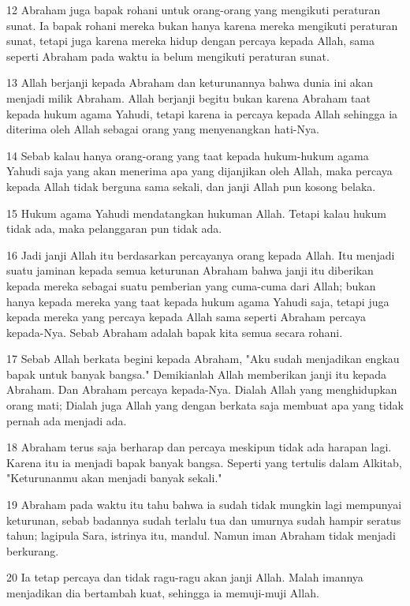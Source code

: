 \par 12 Abraham juga bapak rohani untuk orang-orang yang mengikuti peraturan sunat. Ia bapak rohani mereka bukan hanya karena mereka mengikuti peraturan sunat, tetapi juga karena mereka hidup dengan percaya kepada Allah, sama seperti Abraham pada waktu ia belum mengikuti peraturan sunat.
\par 13 Allah berjanji kepada Abraham dan keturunannya bahwa dunia ini akan menjadi milik Abraham. Allah berjanji begitu bukan karena Abraham taat kepada hukum agama Yahudi, tetapi karena ia percaya kepada Allah sehingga ia diterima oleh Allah sebagai orang yang menyenangkan hati-Nya.
\par 14 Sebab kalau hanya orang-orang yang taat kepada hukum-hukum agama Yahudi saja yang akan menerima apa yang dijanjikan oleh Allah, maka percaya kepada Allah tidak berguna sama sekali, dan janji Allah pun kosong belaka.
\par 15 Hukum agama Yahudi mendatangkan hukuman Allah. Tetapi kalau hukum tidak ada, maka pelanggaran pun tidak ada.
\par 16 Jadi janji Allah itu berdasarkan percayanya orang kepada Allah. Itu menjadi suatu jaminan kepada semua keturunan Abraham bahwa janji itu diberikan kepada mereka sebagai suatu pemberian yang cuma-cuma dari Allah; bukan hanya kepada mereka yang taat kepada hukum agama Yahudi saja, tetapi juga kepada mereka yang percaya kepada Allah sama seperti Abraham percaya kepada-Nya. Sebab Abraham adalah bapak kita semua secara rohani.
\par 17 Sebab Allah berkata begini kepada Abraham, "Aku sudah menjadikan engkau bapak untuk banyak bangsa." Demikianlah Allah memberikan janji itu kepada Abraham. Dan Abraham percaya kepada-Nya. Dialah Allah yang menghidupkan orang mati; Dialah juga Allah yang dengan berkata saja membuat apa yang tidak pernah ada menjadi ada.
\par 18 Abraham terus saja berharap dan percaya meskipun tidak ada harapan lagi. Karena itu ia menjadi bapak banyak bangsa. Seperti yang tertulis dalam Alkitab, "Keturunanmu akan menjadi banyak sekali."
\par 19 Abraham pada waktu itu tahu bahwa ia sudah tidak mungkin lagi mempunyai keturunan, sebab badannya sudah terlalu tua dan umurnya sudah hampir seratus tahun; lagipula Sara, istrinya itu, mandul. Namun iman Abraham tidak menjadi berkurang.
\par 20 Ia tetap percaya dan tidak ragu-ragu akan janji Allah. Malah imannya menjadikan dia bertambah kuat, sehingga ia memuji-muji Allah.
